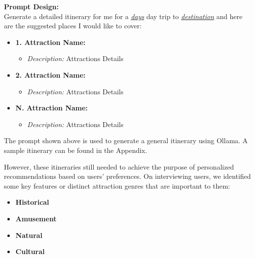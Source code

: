 \documentclass[manuscript,review,anonymous]{acmart}
\begin{document}
        \begin{tcolorbox}[linewidth=1pt, innerleftmargin=15pt, innerrightmargin=15pt, innertopmargin=15pt, innerbottommargin=15pt]
        
        \textbf{Prompt Design:} \\
        Generate a detailed itinerary for me for a \underline{\textit{days}} day trip to  \underline{\textit{destination}} and here are the suggested places I would like to cover:
        
          \begin{itemize}
              \item \textbf{1. Attraction Name:}
              \begin{itemize}
                  \item \textit{Description:} Attractions Details
              \end{itemize}
              \item \textbf{2. Attraction Name:}
              \begin{itemize}
                  \item \textit{Description:} Attractions Details
              \end{itemize}
              \item \textbf{N. Attraction Name:}
              \begin{itemize}
                  \item \textit{Description:} Attractions Details
              \end{itemize}
          \end{itemize}
        \end{tcolorbox}
        
        The prompt shown above is used to generate a general itinerary using Ollama. A sample itinerary can be found in the Appendix.
        
        However, these itineraries still needed to achieve the purpose of personalized recommendations based on users' preferences. On interviewing users, we identified some key features or distinct attraction genres that are important to them:
        
        \begin{itemize}[noitemsep, topsep=5pt, parsep=0pt, partopsep=0pt]
            \item \textbf{Historical}
            \item \textbf{Amusement}
            \item \textbf{Natural}
            \item \textbf{Cultural}
        \end{itemize}
        
\end{document}
